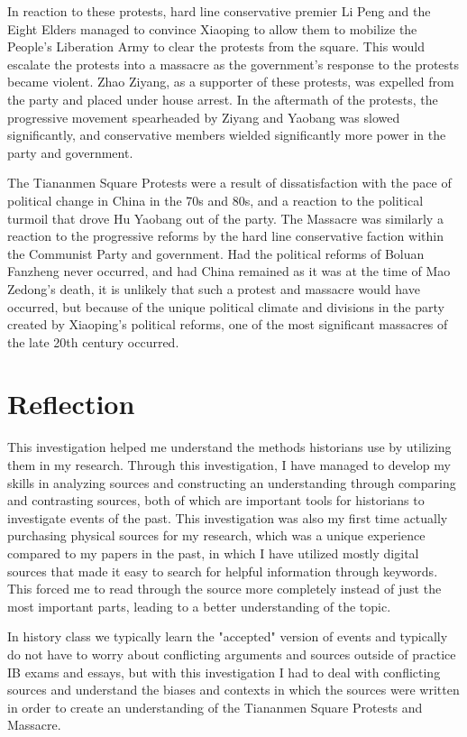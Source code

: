 \documentclass{paper}
\begin{document}
In reaction to these protests, hard line conservative premier Li Peng and the Eight Elders managed to convince Xiaoping to allow them to mobilize the People's Liberation Army to clear the protests from the square.
This would escalate the protests into a massacre as the government's response to the protests became violent.
Zhao Ziyang, as a supporter of these protests, was expelled from the party and placed under house arrest.
In the aftermath of the protests, the progressive movement spearheaded by Ziyang and Yaobang was slowed significantly, and conservative members wielded significantly more power in the party and government.

The Tiananmen Square Protests were a result of dissatisfaction with the pace of political change in China in the 70s and 80s, and a reaction to the political turmoil that drove Hu Yaobang out of the party.
The Massacre was similarly a reaction to the progressive reforms by the hard line conservative faction within the Communist Party and government.
Had the political reforms of Boluan Fanzheng never occurred, and had China remained as it was at the time of Mao Zedong's death, it is unlikely that such a protest and massacre would have occurred, but because of the unique political climate and divisions in the party created by Xiaoping's political reforms, one of the most significant massacres of the late 20th century occurred.

\newpage

\section{Reflection}
This investigation helped me understand the methods historians use by utilizing them in my research.
Through this investigation, I have managed to develop my skills in analyzing sources and constructing an understanding through comparing and contrasting sources, both of which are important tools for historians to investigate events of the past.
This investigation was also my first time actually purchasing physical sources for my research, which was a unique experience compared to my papers in the past, in which I have utilized mostly digital sources that made it easy to search for helpful information through keywords.
This forced me to read through the source more completely instead of just the most important parts, leading to a better understanding of the topic.

In history class we typically learn the "accepted" version of events and typically do not have to worry about conflicting arguments and sources outside of practice IB exams and essays, but with this investigation I had to deal with conflicting sources and understand the biases and contexts in which the sources were written in order to create an understanding of the Tiananmen Square Protests and Massacre.

\singlespacing
\newpage
\printbibliography
\thispagestyle{empty}
\end{document}
